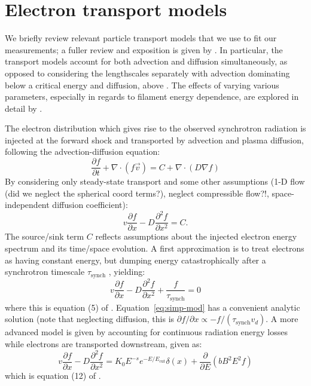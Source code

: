 \documentclass[iop, apj, numberedappendix, twocolappendix]{emulateapj}
\newcommand*{\mt}{\mathrm}
\newcommand*{\ptl}{\partial}
\newcommand*{\del}{\nabla}
\newcommand*{\tsynch}{\tau_{\mt{synch}}}
\begin{document}
\section{Electron transport models}\label{sec:transport}

We briefly review relevant particle transport models that we use to fit our
measurements; a fuller review and exposition is given by .
  In particular, the transport models 
account for both advection and diffusion simultaneously, as opposed to
considering the lengthscales separately with advection dominating below a
critical energy and diffusion, above
\citep{bamba2003, vink2003, yamazaki2004, bamba2005-hist}
.
The effects of varying various parameters, especially in regards to filament
energy dependence, are explored in detail by .

The electron distribution which gives rise to the observed synchrotron
radiation is injected at the forward shock and transported by advection
and plasma diffusion, following the advection-diffusion equation:
\[
  \frac{\ptl f}{\ptl t} + \del \cdot \left( f \vec{v} \right)
  = C + \del \cdot \left( D \del f \right)
\]
By considering only steady-state transport and some other assumptions
(1-D flow (did we neglect the spherical coord terms?), neglect compressible flow?!,
space-independent diffusion coefficient):
\[
    v \frac{\ptl f}{\ptl x} - D \frac{\ptl^2 f}{\ptl x^2} = C .
\]
The source/sink term $C$ reflects assumptions about the injected electron
energy spectrum and its time/space evolution.
A first approximation is to treat electrons as having constant energy, but
dumping energy catastrophically after a synchrotron timescale
$\tsynch$ , yielding:
\begin{equation} \label{eq:simp-mod}
    v \frac{\ptl f}{\ptl x} - D \frac{\ptl^2 f}{\ptl x^2} +
    \frac{f}{\tau_{\mt{synch}}} = 0
\end{equation}
where this is equation (5) of .
Equation~\eqref{eq:simp-mod} has a convenient analytic solution (note that
neglecting diffusion, this is $\ptl f/\ptl x \propto -f/(\tsynch v_d)$.
A more advanced model is given by accounting for continuous radiation energy
losses while electrons are transported downstream, given as:
\begin{equation} \label{eq:full-mod}
    v \frac{\ptl f}{\ptl x} - D \frac{\ptl^2 f}{\ptl x^2} =
    K_0 E^{-s} e^{-E/E_{\mt{cut}}} \delta(x) + \frac{\ptl}{\ptl E}
      \left(bB^2E^2f\right)
\end{equation}
which is equation (12) of .
\end{document}
